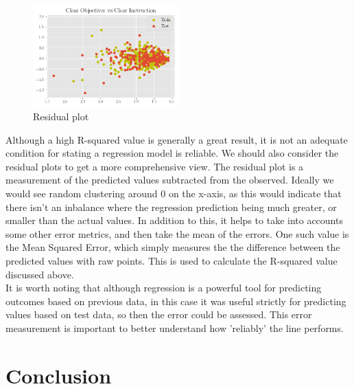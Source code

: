 \documentclass[10pt]{report}
\begin{document}
\begin{figure}
    \centering
    \includegraphics[width=0.50\textwidth]{results/residual}
    \caption{Residual plot}
\end{figure}

Although a high R-squared value is generally a great result, it is not an adequate condition for stating a regression model is reliable. 
We should also consider the residual plots to get a more comprehensive view. The residual plot is a measurement of the predicted
values subtracted from the observed. Ideally we would see random clustering around 0 on the x-axis, as this would indicate that there 
isn't an inbalance where the regression prediction being much greater, or smaller than the actual values. In addition to this, it helps
to take into accounts some other error metrics, and then take the mean of the errors. One such value is the Mean Squared Error, 
which simply measures the the difference between the predicted values with raw points. This is used to calculate the R-squared value
discussed above. \\
It is worth noting that although regression is a powerful tool for predicting outcomes based on previous data, in this case it was useful
strictly for predicting values based on test data, so then the error could be assessed. This error measurement is important to better
understand how 'reliably' the line performs. 





\newpage
\section*{Conclusion}
\end{document}
